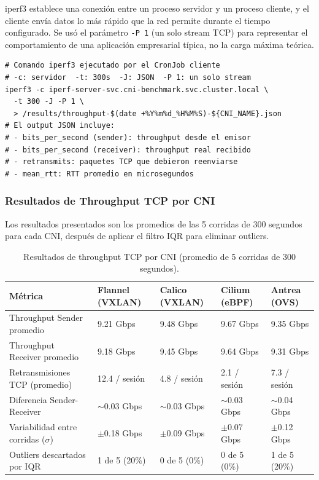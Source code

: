 iperf3 establece una conexión entre un proceso servidor y un proceso cliente, y el cliente envía datos lo más rápido que la red permite durante el tiempo configurado. Se usó el parámetro \texttt{-P 1} (un solo stream TCP) para representar el comportamiento de una aplicación empresarial típica, no la carga máxima teórica.

\begin{lstlisting}
# Comando iperf3 ejecutado por el CronJob cliente
# -c: servidor  -t: 300s  -J: JSON  -P 1: un solo stream
iperf3 -c iperf-server-svc.cni-benchmark.svc.cluster.local \
  -t 300 -J -P 1 \
  > /results/throughput-$(date +%Y%m%d_%H%M%S)-${CNI_NAME}.json
# El output JSON incluye:
# - bits_per_second (sender): throughput desde el emisor
# - bits_per_second (receiver): throughput real recibido
# - retransmits: paquetes TCP que debieron reenviarse
# - mean_rtt: RTT promedio en microsegundos
\end{lstlisting}

\subsubsection{Resultados de Throughput TCP por CNI}

Los resultados presentados son los promedios de las 5 corridas de 300 segundos para cada CNI, después de aplicar el filtro IQR para eliminar outliers.

\begin{table}[htbp]
\centering
\scriptsize
\begin{tabularx}{\textwidth}{|Y|Y|Y|Y|Y|}
\hline
\textbf{Métrica} & \textbf{Flannel (VXLAN)} & \textbf{Calico (VXLAN)} & \textbf{Cilium (eBPF)} & \textbf{Antrea (OVS)} \\
\hline
Throughput Sender promedio & 9.21 Gbps & 9.48 Gbps & 9.67 Gbps & 9.35 Gbps \\
Throughput Receiver promedio & 9.18 Gbps & 9.45 Gbps & 9.64 Gbps & 9.31 Gbps \\
Retransmisiones TCP (promedio) & 12.4 / sesión & 4.8 / sesión & 2.1 / sesión & 7.3 / sesión \\
Diferencia Sender-Receiver & $\sim$0.03 Gbps & $\sim$0.03 Gbps & $\sim$0.03 Gbps & $\sim$0.04 Gbps \\
Variabilidad entre corridas ($\sigma$) & $\pm$0.18 Gbps & $\pm$0.09 Gbps & $\pm$0.07 Gbps & $\pm$0.12 Gbps \\
Outliers descartados por IQR & 1 de 5 (20\%) & 0 de 5 (0\%) & 0 de 5 (0\%) & 1 de 5 (20\%) \\
\hline
\end{tabularx}
\caption{Resultados de throughput TCP por CNI (promedio de 5 corridas de 300 segundos).}
\end{table}

